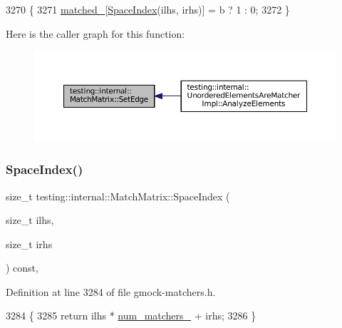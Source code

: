 \begin{DoxyCode}
3270                                                  \{
3271     \hyperlink{classtesting_1_1internal_1_1MatchMatrix_ae01ec0d94b7812559acfcf84f10707e2}{matched\_}[\hyperlink{classtesting_1_1internal_1_1MatchMatrix_aa5c4d081304a4923df078bd153c735e4}{SpaceIndex}(ilhs, irhs)] = b ? 1 : 0;
3272   \}
\end{DoxyCode}
Here is the caller graph for this function\+:
\nopagebreak
\begin{figure}[H]
\begin{center}
\leavevmode
\includegraphics[width=350pt]{classtesting_1_1internal_1_1MatchMatrix_aac7e9c6e0e4b51e6b1334829a0781021_icgraph}
\end{center}
\end{figure}
\mbox{\label{classtesting_1_1internal_1_1MatchMatrix_aa5c4d081304a4923df078bd153c735e4}} 
\subsubsection{\texorpdfstring{Space\+Index()}{SpaceIndex()}}
{\footnotesize\ttfamily size\+\_\+t testing\+::internal\+::\+Match\+Matrix\+::\+Space\+Index (\begin{DoxyParamCaption}\item[{size\+\_\+t}]{ilhs,  }\item[{size\+\_\+t}]{irhs }\end{DoxyParamCaption}) const\hspace{0.3cm}{\ttfamily [inline]}, {\ttfamily [private]}}



Definition at line 3284 of file gmock-\/matchers.\+h.


\begin{DoxyCode}
3284                                                     \{
3285     \textcolor{keywordflow}{return} ilhs * \hyperlink{classtesting_1_1internal_1_1MatchMatrix_aa89a05c387a88844fd30f03d1a24ce35}{num\_matchers\_} + irhs;
3286   \}
\end{DoxyCode}


